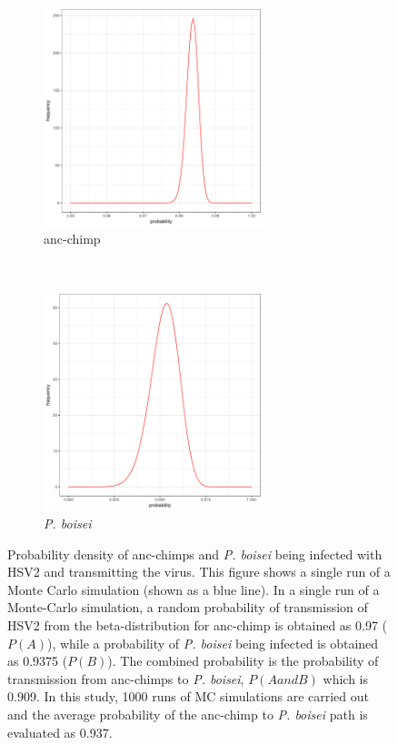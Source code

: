 \documentclass[fleqn,10pt]{wlscirep}
\begin{document}
\begin{figure}[!h]
	\centering
	\begin{subfigure}[b]{0.7\textwidth}
		\centering
		\includegraphics[width=0.7\textwidth]{figs/beta-chimp}
		\caption{anc-chimp}
		\label{fig:beta-chimp}   
	\end{subfigure} \\       
	\begin{subfigure}[b]{0.7\textwidth}
		\centering
		\includegraphics[width=0.7\textwidth]{figs/beta-boisei}
		\caption{\textit{P. boisei}}
		\label{fig:beta-boisei}
	\end{subfigure}
	\caption{Probability density of anc-chimps and \textit{P. boisei} being infected with HSV2 and transmitting the virus. This figure shows a single run of a Monte Carlo simulation (shown as a blue line). In a single run of a Monte-Carlo simulation, a random probability of transmission of HSV2 from the beta-distribution for anc-chimp is obtained as 0.97 ($P(A)$), while a probability of \textit{P. boisei} being infected is obtained as 0.9375 ($P(B)$). The combined probability is the probability of transmission from anc-chimps to \textit{P. boisei}, $P(A and B)$ which is 0.909. In this study, 1000 runs of MC simulations are carried out and the average probability of the anc-chimp to \textit{P. boisei} path is evaluated as 0.937.}
	\label{fig:chimp-boisei}   
\end{figure}  
\end{document}

